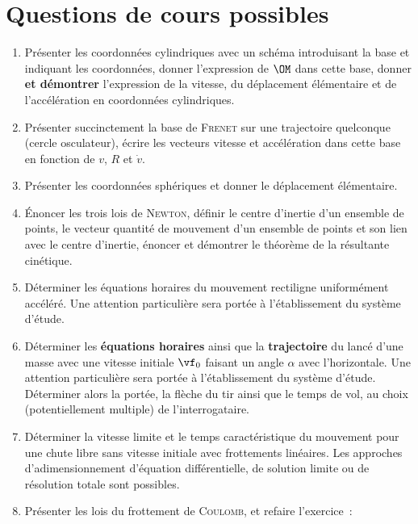 \documentclass[a4paper, 12pt, final, garamond]{book}
\begin{document}
\section{Questions de cours possibles}
\begin{enumerate}[label=\sqenumi]
    \item Présenter les coordonnées cylindriques avec un schéma introduisant la
        base et indiquant les coordonnées, donner l'expression de $\OM$ dans
        cette base, donner \textbf{et démontrer} l'expression de la vitesse, du
        déplacement élémentaire et de l'accélération en coordonnées cylindriques.
    \item Présenter succinctement la base de \textsc{Frenet} sur une trajectoire
        quelconque (cercle osculateur), écrire les vecteurs vitesse et
        accélération dans cette base en fonction de $v$, $R$ et $\dot{v}$.
    \item Présenter les coordonnées sphériques et donner le déplacement
        élémentaire.
    \item Énoncer les trois lois de \textsc{Newton}, définir le centre d'inertie
        d'un ensemble de points, le vecteur quantité de mouvement d'un
        ensemble de points et son lien avec le centre d'inertie, énoncer et
        démontrer le théorème de la résultante cinétique.
    \item Déterminer les équations horaires du mouvement rectiligne uniformément
        accéléré. Une attention particulière sera portée à l'établissement du
        système d'étude.
    \item Déterminer les \textbf{équations horaires} ainsi que la
        \textbf{trajectoire} du lancé d'une masse avec une vitesse initiale
        $\vf_0$ faisant un angle $\alpha$ avec l'horizontale. Une attention
        particulière sera portée à l'établissement du système d'étude.
        Déterminer alors la portée, la flèche du tir ainsi que le temps de vol,
        au choix (potentiellement multiple) de l'interrogataire.
    \item Déterminer la vitesse limite et le temps caractéristique du mouvement
        pour une chute libre sans vitesse initiale avec frottements linéaires.
        Les approches d'adimensionnement d'équation différentielle, de solution
        limite ou de résolution totale sont possibles.
    \item Présenter les lois du frottement de \textsc{Coulomb}, et refaire
        l'exercice~:
\end{enumerate}
\end{document}
